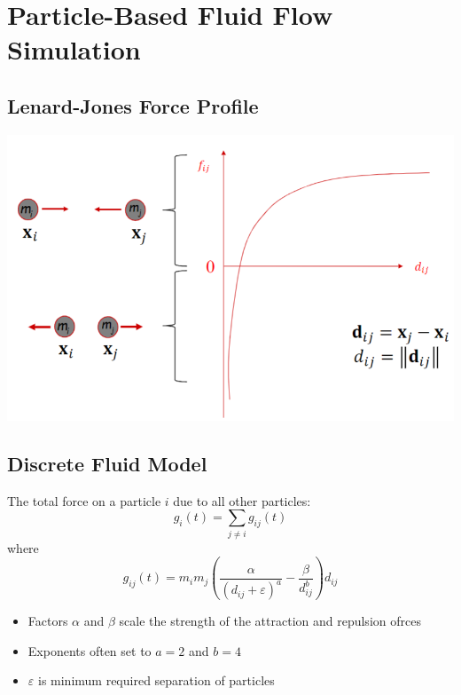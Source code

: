 \documentclass{article}
\begin{document}
\section*{Particle-Based Fluid Flow Simulation}
\subsection*{Lenard-Jones Force Profile}
\begin{center}
    \includegraphics*[scale=0.8]{W5_4.png}
\end{center}

\subsection*{Discrete Fluid Model}
The total force on a particle $i$ due to all other particles:
\[g_i(t) = \sum_{j \neq i} g_{ij}(t)\]
where
\[g_{ij}(t) = m_i m_j \left(\frac{\alpha}{(d_{ij} + \varepsilon)^a} - \frac{\beta}{d_{ij}^b}\right) d_{ij}\]
\begin{itemize}
    \item Factors $\alpha$ and $\beta$ scale the strength of the attraction and repulsion ofrces
    \item Exponents often set to $a = 2$ and $b = 4$
    \item $\varepsilon$ is minimum required separation of particles
\end{itemize}
\end{document}
